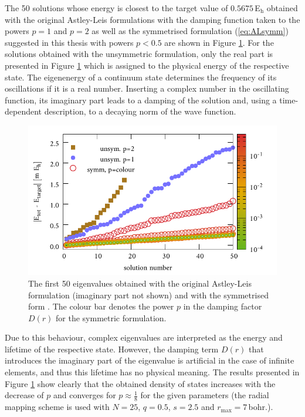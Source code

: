 The 50 solutions whose energy is closest to the target value of $0.5675\,$E$_\text{h}$ obtained with the original Astley-Leis formulations with the damping function taken to the powers $p=1$ and $p=2$ as well as the symmetrised formulation (\ref{eq:ALsymm}) suggested in this thesis with powers $p<0.5$ are shown in Figure \ref{fig:IFEMform_spect}.
For the solutions obtained with the unsymmetric formulation, only the real part is presented in Figure \ref{fig:IFEMform_spect} which is assigned to the physical energy of the respective state.
The eigenenergy of a continuum state determines the frequency of its oscillations if it is a real number.
Inserting a complex number in the oscillating function, its imaginary part leads to a damping of the solution and, using a time-dependent description, to a decaying norm of the wave function.
\begin{figure}[h]
\includegraphics[width=\textwidth]{Figures/IFem_form_spectra}
\caption{The first 50 eigenvalues obtained with the original Astley-Leis formulation (imaginary part not shown) and with the symmetrised form .
The colour bar denotes the power $p$ in the damping factor $D(r)$ for the symmetric formulation.}
\label{fig:IFEMform_spect}
\end{figure}
Due to this behaviour, complex eigenvalues are interpreted as the energy and lifetime of the respective state.
However, the damping term $D(r)$ that introduces the imaginary part of the eigenvalue is artificial in the case of infinite elements, and thus this lifetime has no physical meaning. 
The results presented in Figure \ref{fig:IFEMform_spect} show clearly that the obtained density of states increases with the decrease of $p$ and converges for $p\approx \frac 18$ for the given parameters (the radial mapping scheme  is used with $N=25$, $q=0.5$, $s=2.5$ and $r_\text{max}=7\,$bohr.).
